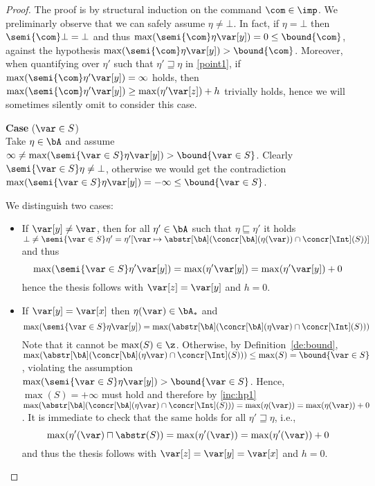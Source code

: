 \begin{proof}
   The proof is by
  structural induction on the command \(\com\in \imp\).
  We preliminarly observe that we can safely assume
  \(\eta \neq \bot\).
  In fact, if \(\eta = \bot\) then \(\semi{\com} \bot = \bot\) and
  thus \(\max(\semi{\com} \eta \var[y]) = 0 \leq \bound{\com}\),
  against the hypothesis
  \(\max(\semi{\com}\eta \var[y]) > \bound{\com}\). Moreover, when
  quantifying over \(\eta'\) such that \(\eta' \sqsupseteq \eta\) in
  \ref{point1}, if \(\max(\semi{\com}\eta' \var[y]) = \infty\)
  holds, then
  \(\max(\semi{\com}\eta' \var[y]) \geq \max(\eta' \var[z]) + h\)
  trivially holds, hence we will sometimes silently omit to consider
  this case.
  
  \medskip
  
  \noindent
  \textbf{Case} (\(\var \in S\))\\
  Take \(\eta \in \bA\) and assume
  \(\infty\neq\max(\semi{\var \in S}\eta \var[y]) > \bound{\var \in S}\).
  Clearly \(\semi{\var \in S}\eta \neq \bot\), otherwise we would get
  the contradiction
  \(\max(\semi{\var \in S}\eta \var[y]) = -\infty \leq \bound{\var \in
    S}\).
  
  We distinguish two cases:
  \begin{itemize}
    
  \item If \(\var[y] \neq \var\), then for all
    \(\eta' \in \bA\) such that \(\eta \sqsubseteq \eta'\) it
    holds
    \(\bot \neq \semi{\var \in S}\eta' = \eta'[\var \mapsto
    {\abstr[\bA](\concr[\bA](\eta(\var)) \cap \concr[\Int](S))}]\) and
    thus
    \begin{equation*}
      \max(\semi{\var \in S}\eta' \var[y]) = \max(\eta' \var[y]) = \max(\eta' \var[y]) + 0
    \end{equation*}
    hence the thesis follows with \(\var[z]=\var[y]\) and \(h = 0\).

  \item If \(\var[y] = \var[x]\) then \(\eta(\var) \in \bA_*\) and
    \begin{equation*}
      \max(\semi{\var \in S}\eta \var[y]) = \max(\abstr[\bA](\concr[\bA](\eta\var) \cap \concr[\Int](S)))
    \end{equation*}
    Note that it cannot be \(\max(S)\in \z\). Otherwise, by
    Definition~\ref{de:bound},
    \(\max ({\abstr[\bA](\concr[\bA](\eta\var) \cap \concr[\Int](S))})
    \leq \max(S)= \bound{\var \in S}\), violating the assumption
    \(\max(\semi{\var \in S}\eta \var[y]) > \bound{\var \in S}\).
    Hence, \(\max(S) = +\infty\) must hold and therefore by
    \ref{inc:hp1}
    \(\max ({\abstr[\bA](\concr[\bA](\eta\var) \cap \concr[\Int](S))})
    = \max(\eta(\var))= \max(\eta(\var))+0\). It is immediate to check
    that the same holds for all \(\eta' \sqsupseteq \eta\), i.e.,
    \[
    \max (\eta'(\var) \sqcap \abstr(S)) = \max(\eta'(\var))=
    \max(\eta'(\var))+0
    \]
    and thus the thesis follows with  \(\var[z]=\var[y]=\var[x]\) and \(h=0\).
  \end{itemize}  
  

\end{proof}

